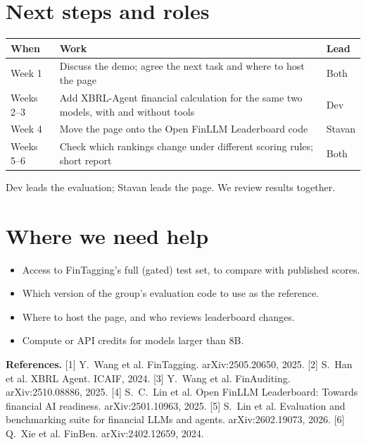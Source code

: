 \documentclass[10pt]{article}
\begin{document}
\section{Next steps and roles}
{\centering\small
\begin{tabular}{p{2.0cm}p{10.4cm}p{2.4cm}}
\toprule
When & Work & Lead \\
\midrule
Week 1   & Discuss the demo; agree the next task and where to host the page & Both \\
Weeks 2--3 & Add XBRL-Agent financial calculation for the same two models, with and without tools & Dev \\
Week 4   & Move the page onto the Open FinLLM Leaderboard code & Stavan \\
Weeks 5--6 & Check which rankings change under different scoring rules; short report & Both \\
\bottomrule
\end{tabular}\par}
\vspace{3pt}
Dev leads the evaluation; Stavan leads the page. We review results together.

\section{Where we need help}
\begin{itemize}
\item Access to FinTagging's full (gated) test set, to compare with published scores.
\item Which version of the group's evaluation code to use as the reference.
\item Where to host the page, and who reviews leaderboard changes.
\item Compute or API credits for models larger than 8B.
\end{itemize}

\vspace{4pt}
{\footnotesize\textbf{References.}
[1] Y.~Wang et al. FinTagging. arXiv:2505.20650, 2025.
[2] S.~Han et al. XBRL Agent. ICAIF, 2024.
[3] Y.~Wang et al. FinAuditing. arXiv:2510.08886, 2025.
[4] S.~C.~Lin et al. Open FinLLM Leaderboard: Towards financial AI readiness. arXiv:2501.10963, 2025.
[5] S.~Lin et al. Evaluation and benchmarking suite for financial LLMs and agents. arXiv:2602.19073, 2026.
[6] Q.~Xie et al. FinBen. arXiv:2402.12659, 2024.\par}
\end{document}
